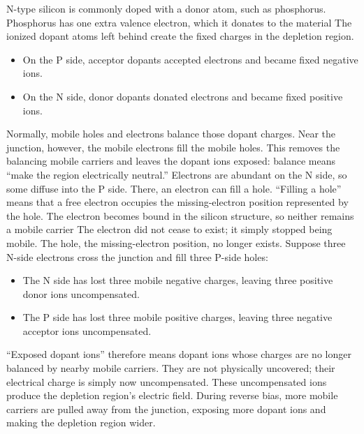 \documentclass{report}
\begin{document}
\begin{itemize}
            \bigbreak \noindent 
            N-type silicon is commonly doped with a donor atom, such as phosphorus. Phosphorus has one extra valence electron, which it donates to the material
            \bigbreak \noindent 
            The ionized dopant atoms left behind create the fixed charges in the depletion region.
            \begin{itemize}
                \item On the P side, acceptor dopants accepted electrons and became fixed negative ions.
                \item On the N side, donor dopants donated electrons and became fixed positive ions.
            \end{itemize}
            Normally, mobile holes and electrons balance those dopant charges. Near the junction, however, the mobile electrons fill the mobile holes. This removes the balancing mobile carriers and leaves the dopant ions exposed:
            \bigbreak \noindent 
            balance means “make the region electrically neutral.”
            \bigbreak \noindent 
            Electrons are abundant on the N side, so some diffuse into the P side. There, an electron can fill a hole.
            \bigbreak \noindent 
            “Filling a hole” means that a free electron occupies the missing-electron position represented by the hole. The electron becomes bound in the silicon structure, so neither remains a mobile carrier
            \bigbreak \noindent 
            The electron did not cease to exist; it simply stopped being mobile. The hole, the missing-electron position, no longer exists.
            \bigbreak \noindent 
            Suppose three N-side electrons cross the junction and fill three P-side holes:
            \begin{itemize}
                \item The N side has lost three mobile negative charges, leaving three positive donor ions uncompensated.
                \item The P side has lost three mobile positive charges, leaving three negative acceptor ions uncompensated.
            \end{itemize}
            \bigbreak \noindent 
            “Exposed dopant ions” therefore means dopant ions whose charges are no longer balanced by nearby mobile carriers. They are not physically uncovered; their electrical charge is simply now uncompensated. These uncompensated ions produce the depletion region’s electric field.
            \bigbreak \noindent 
            During reverse bias, more mobile carriers are pulled away from the junction, exposing more dopant ions and making the depletion region wider.

\end{itemize}
\end{document}
